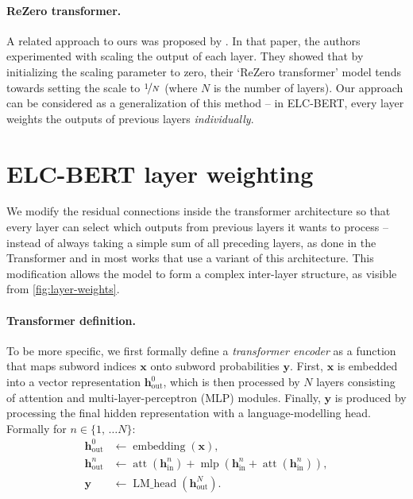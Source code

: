\paragraph{ReZero transformer.} A related approach to ours was proposed by . In that paper, the authors experimented with scaling the output of each layer. They showed that by initializing the scaling parameter to zero, their `ReZero transformer' model tends towards setting the scale to $\nicefrac{1}{N}$ (where $N$ is the number of layers). Our approach can be considered as a generalization of this method -- in ELC-BERT, every layer weights the outputs of previous layers \textit{individually}.

\section{ELC-BERT layer weighting} \label{sec:methods}

We modify the residual connections inside the transformer architecture so that every layer can select which outputs from previous layers it wants to process -- instead of always taking a simple sum of all preceding layers, as done in the Transformer \citep{vaswani2017attention} and in most works that use a variant of this architecture. This modification allows the model to form a complex inter-layer structure, as visible from \cref{fig:layer-weights}.

\paragraph{Transformer definition.} To be more specific, we first formally define a \textit{transformer encoder} as a function that maps subword indices $\bm{x}$ onto subword probabilities $\bm{y}$. First, $\bm{x}$ is embedded into a vector representation $\bm{h}^0_{\text{out}}$, which is then processed by $N$ layers consisting of attention and multi-layer-perceptron (MLP) modules. Finally, $\bm{y}$ is produced by processing the final hidden representation with a language-modelling head. Formally for $n \in \{1,\,\dots N\}$:
\begin{align}
    \bm{h}^0_{\text{out}} &\gets \operatorname{embedding}(\bm{x}), \label{eq:embedding}\\
    \bm{h}^n_{\text{out}} &\gets \operatorname{att}(\bm{h}^n_{\text{in}}) + \operatorname{mlp}\!\left({\bm{h}^n_{\text{in}} + \operatorname{att}(\bm{h}^n_{\text{in}})}\right), \label{eq:transformer-layer}\\
    \bm{y} &\gets \operatorname{LM\_head}(\bm{h}^{N}_{\text{out}}). \label{eq:lm-head}
\end{align}

